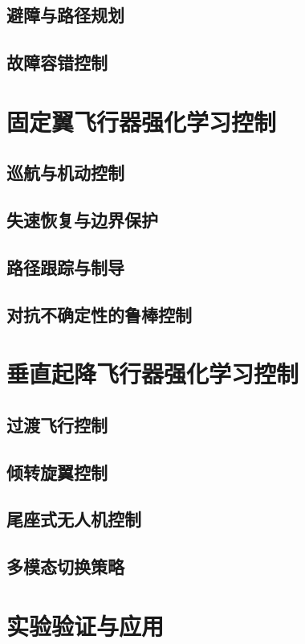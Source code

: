 \documentclass[12pt,a4paper]{ctexart}
\begin{document}
\subsection{避障与路径规划}
\subsection{故障容错控制}

\section{固定翼飞行器强化学习控制}
\subsection{巡航与机动控制}
\subsection{失速恢复与边界保护}
\subsection{路径跟踪与制导}
\subsection{对抗不确定性的鲁棒控制}

\section{垂直起降飞行器强化学习控制}
\subsection{过渡飞行控制}
\subsection{倾转旋翼控制}
\subsection{尾座式无人机控制}
\subsection{多模态切换策略}

\section{实验验证与应用}
\end{document}
